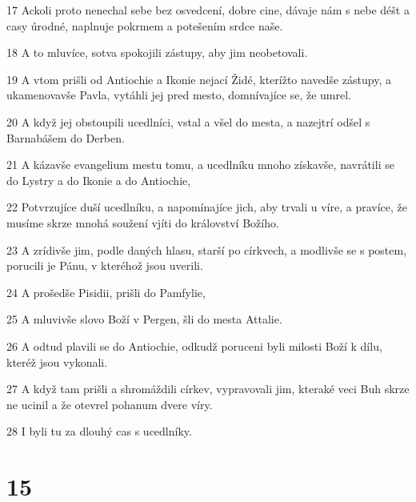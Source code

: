 \par 17 Ackoli proto nenechal sebe bez osvedcení, dobre cine, dávaje nám s nebe déšt a casy úrodné, naplnuje pokrmem a potešením srdce naše.
\par 18 A to mluvíce, sotva spokojili zástupy, aby jim neobetovali.
\par 19 A vtom prišli od Antiochie a Ikonie nejací Židé, kterížto navedše zástupy, a ukamenovavše Pavla, vytáhli jej pred mesto, domnívajíce se, že umrel.
\par 20 A když jej obstoupili ucedlníci, vstal a všel do mesta, a nazejtrí odšel s Barnabášem do Derben.
\par 21 A kázavše evangelium mestu tomu, a ucedlníku mnoho získavše, navrátili se do Lystry a do Ikonie a do Antiochie,
\par 22 Potvrzujíce duší ucedlníku, a napomínajíce jich, aby trvali u víre, a pravíce, že musíme skrze mnohá soužení vjíti do království Božího.
\par 23 A zrídivše jim, podle daných hlasu, starší po církvech, a modlivše se s postem, porucili je Pánu, v kteréhož jsou uverili.
\par 24 A prošedše Pisidii, prišli do Pamfylie,
\par 25 A mluvivše slovo Boží v Pergen, šli do mesta Attalie.
\par 26 A odtud plavili se do Antiochie, odkudž poruceni byli milosti Boží k dílu, kteréž jsou vykonali.
\par 27 A když tam prišli a shromáždili církev, vypravovali jim, kteraké veci Buh skrze ne ucinil a že otevrel pohanum dvere víry.
\par 28 I byli tu za dlouhý cas s ucedlníky.

\chapter{15}


